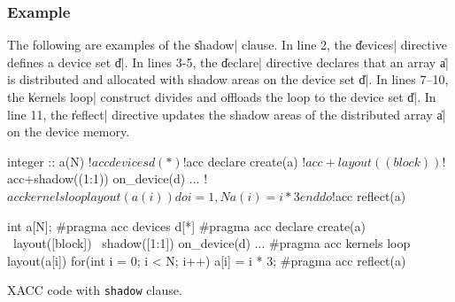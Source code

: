
\subsubsection*{Example}

The following are examples of the \|shadow| clause.
In line 2, the \|devices| directive defines a device set \|d|.
In lines 3-5, the \|declare| directive declares that an array \|a|
is distributed and allocated with shadow areas on the device set \|d|.
In lines 7--10, the \|kernels loop| construct divides and offloads the
loop to the device set \|d|.
In line 11, the \|reflect| directive updates the shadow areas of the
distributed array \|a| on the device memory.
%
\begin{myfigure}
\begin{minipage}{0.47\hsize}
\begin{center}
\begin{XACCFexampleL}
integer :: a(N)
!$acc devices d(*)
!$acc declare create(a)
!$acc+layout((block))
!$acc+shadow((1:1)) on_device(d)
...
!$acc kernels loop layout(a(i))
do i = 1, N
  a(i) = i * 3
end do
!$acc reflect(a)
\end{XACCFexampleL}
\end{center}
\end{minipage}
%
\begin{minipage}{0.51\hsize}
\begin{center}
\begin{XACCCexampleR}
int a[N];
#pragma acc devices d[*]
#pragma acc declare create(a) \
        layout([block]) \
        shadow([1:1]) on_device(d)
...
#pragma acc kernels loop layout(a[i])
for(int i = 0; i < N; i++){
  a[i] = i * 3;
}
#pragma acc reflect(a)
\end{XACCCexampleR}
\end{center}
\end{minipage}
\caption{XACC code with {\tt shadow} clause.}\label{code:shadow_clause}
\end{myfigure}



